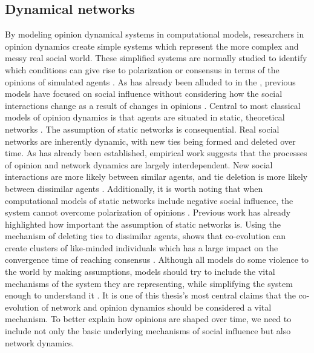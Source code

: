 \documentclass[11pt]{article}
\begin{document}
\subsection{Dynamical networks}
By modeling opinion dynamical systems in computational models, researchers in opinion dynamics create simple systems which represent the more complex and messy real social world. These simplified systems are normally studied to identify which conditions can give rise to polarization or consensus in terms of the opinions of simulated agents \cite{flache_models_2017}. As has already been alluded to in the \textit{}, previous models have focused on social influence without considering how the social interactions change as a result of changes in opinions \cite{galesic_integrating_2021,holme_nonequilibrium_2006,jalili_coevolution_2015}. Central to most classical models of opinion dynamics is that agents are situated in static, theoretical networks \cite{flache_models_2017}. The assumption of static networks is consequential. Real social networks are inherently dynamic, with new ties being formed and deleted over time. As has already been established, empirical work suggests that the processes of opinion and network dynamics are largely interdependent. New social interactions are more likely between similar agents, and tie deletion is more likely between dissimilar agents \cite{kossinets_origins_2009, bener_empirical_2016}. Additionally, it is worth noting that when computational models of static networks include negative social influence, the system cannot overcome polarization of opinions \cite{flache_models_2017, kozma2008consensus}. Previous work has already highlighted how important the assumption of static networks is. Using the mechanism of deleting ties to dissimilar agents,  shows that co-evolution can create clusters of like-minded individuals which has a large impact on the convergence time of reaching consensus \cite{kozma2008consensus}. 
Although all models do some violence to the world by making assumptions, models should try to include the vital mechanisms of the system they are representing, while simplifying the system enough to understand it \cite{epstein1999agent,smaldino_models_2016}. It is one of this thesis's most central claims that the co-evolution of network and opinion dynamics should be considered a vital mechanism. To better explain how opinions are shaped over time, we need to include not only the basic underlying mechanisms of social influence but also network dynamics. 
\end{document}
